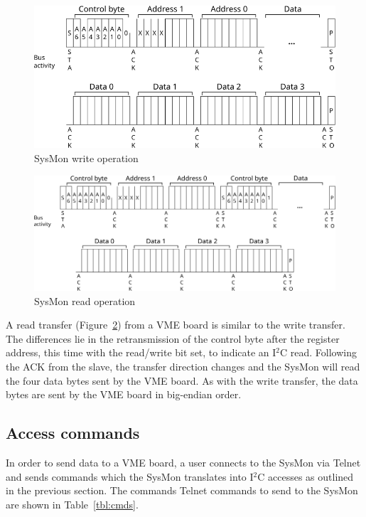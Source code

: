 \documentclass[a4paper,11pt]{article}
\begin{document}
\begin{figure}[h]
  \centerline{\includegraphics[width=.9\textwidth]{fig/sysmon-wr}}
  \caption{SysMon write operation}
  \label{fig:sysmon-wr}
\end{figure}

\begin{figure}[h]
  \centerline{\includegraphics[width=\textwidth]{fig/sysmon-rd}}
  \caption{SysMon read operation}
  \label{fig:sysmon-rd}
\end{figure}

A read transfer (Figure~\ref{fig:sysmon-rd}) from a VME board is similar 
to the write transfer. The differences lie in the retransmission of the
control byte after the register address, this time with the read/write
bit set, to indicate an I$^2$C read. Following the ACK from the slave,
the transfer direction changes and the SysMon will read the four data
bytes sent by the VME board. As with the write transfer, the data bytes
are sent by the VME board in big-endian order.

\subsection{Access commands}
\label{sec:elma-prot-cmds}

In order to send data to a VME board, a user connects to the SysMon via Telnet
and sends commands which the SysMon translates into I$^2$C accesses as outlined
in the previous section. The commands Telnet commands to send to the SysMon are
shown in Table~\ref{tbl:cmds}.
\end{document}
